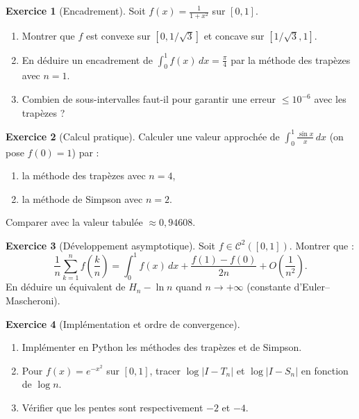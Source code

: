 \documentclass[a4paper,12pt]{article}
\theoremstyle{definition}
\newtheorem{exercice}{Exercice}[section]
\theoremstyle{plain}
\theoremstyle{remark}
\begin{document}
\begin{exercice}[Encadrement]
Soit $f(x) = \frac{1}{1+x^2}$ sur $[0,1]$.
\begin{enumerate}[label=\alph*)]
  \item Montrer que $f$ est convexe sur $[0, 1/\sqrt{3}]$ et concave sur $[1/\sqrt{3}, 1]$.
  \item En déduire un encadrement de $\int_0^1 f(x)\,dx = \frac{\pi}{4}$ par la méthode des trapèzes avec $n=1$.
  \item Combien de sous-intervalles faut-il pour garantir une erreur $\leq 10^{-6}$ avec les trapèzes ?
\end{enumerate}
\end{exercice}

\begin{exercice}[Calcul pratique]
Calculer une valeur approchée de $\displaystyle\int_0^1 \frac{\sin x}{x}\,dx$ (on pose $f(0)=1$) par :
\begin{enumerate}[label=\alph*)]
  \item la méthode des trapèzes avec $n=4$,
  \item la méthode de Simpson avec $n=2$.
\end{enumerate}
Comparer avec la valeur tabulée $\approx 0{,}94608$.
\end{exercice}

\begin{exercice}[Développement asymptotique]
Soit $f \in \mathcal{C}^2([0,1])$. Montrer que :
\[
  \frac{1}{n}\sum_{k=1}^n f\!\left(\frac{k}{n}\right) = \int_0^1 f(x)\,dx + \frac{f(1)-f(0)}{2n} + O\!\left(\frac{1}{n^2}\right).
\]
En déduire un équivalent de $H_n - \ln n$ quand $n \to +\infty$ (constante d'Euler--Mascheroni).
\end{exercice}

\begin{exercice}[Implémentation et ordre de convergence]
\begin{enumerate}[label=\alph*)]
  \item Implémenter en Python les méthodes des trapèzes et de Simpson.
  \item Pour $f(x) = e^{-x^2}$ sur $[0,1]$, tracer $\log|I - T_n|$ et $\log|I - S_n|$ en fonction de $\log n$.
  \item Vérifier que les pentes sont respectivement $-2$ et $-4$.
\end{enumerate}
\end{exercice}

\end{document}
